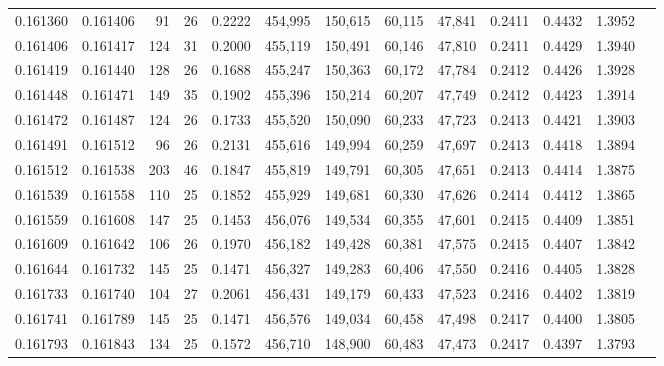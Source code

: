 \begin{tabular}{rrrrrrrrrrrrr}
0.161360 & 0.161406 &    91 &  26 &                                     0.2222 & 454,995 & 150,615 &  60,115 &  47,841 & 0.2411 & 0.4432 & 1.3952 \\
0.161406 & 0.161417 &   124 &  31 &                                     0.2000 & 455,119 & 150,491 &  60,146 &  47,810 & 0.2411 & 0.4429 & 1.3940 \\
0.161419 & 0.161440 &   128 &  26 &                                     0.1688 & 455,247 & 150,363 &  60,172 &  47,784 & 0.2412 & 0.4426 & 1.3928 \\
0.161448 & 0.161471 &   149 &  35 &                                     0.1902 & 455,396 & 150,214 &  60,207 &  47,749 & 0.2412 & 0.4423 & 1.3914 \\
0.161472 & 0.161487 &   124 &  26 &                                     0.1733 & 455,520 & 150,090 &  60,233 &  47,723 & 0.2413 & 0.4421 & 1.3903 \\
0.161491 & 0.161512 &    96 &  26 &                                     0.2131 & 455,616 & 149,994 &  60,259 &  47,697 & 0.2413 & 0.4418 & 1.3894 \\
0.161512 & 0.161538 &   203 &  46 &                                     0.1847 & 455,819 & 149,791 &  60,305 &  47,651 & 0.2413 & 0.4414 & 1.3875 \\
0.161539 & 0.161558 &   110 &  25 &                                     0.1852 & 455,929 & 149,681 &  60,330 &  47,626 & 0.2414 & 0.4412 & 1.3865 \\
0.161559 & 0.161608 &   147 &  25 &                                     0.1453 & 456,076 & 149,534 &  60,355 &  47,601 & 0.2415 & 0.4409 & 1.3851 \\
0.161609 & 0.161642 &   106 &  26 &                                     0.1970 & 456,182 & 149,428 &  60,381 &  47,575 & 0.2415 & 0.4407 & 1.3842 \\
0.161644 & 0.161732 &   145 &  25 &                                     0.1471 & 456,327 & 149,283 &  60,406 &  47,550 & 0.2416 & 0.4405 & 1.3828 \\
0.161733 & 0.161740 &   104 &  27 &                                     0.2061 & 456,431 & 149,179 &  60,433 &  47,523 & 0.2416 & 0.4402 & 1.3819 \\
0.161741 & 0.161789 &   145 &  25 &                                     0.1471 & 456,576 & 149,034 &  60,458 &  47,498 & 0.2417 & 0.4400 & 1.3805 \\
0.161793 & 0.161843 &   134 &  25 &                                     0.1572 & 456,710 & 148,900 &  60,483 &  47,473 & 0.2417 & 0.4397 & 1.3793 \\

\end{tabular}
